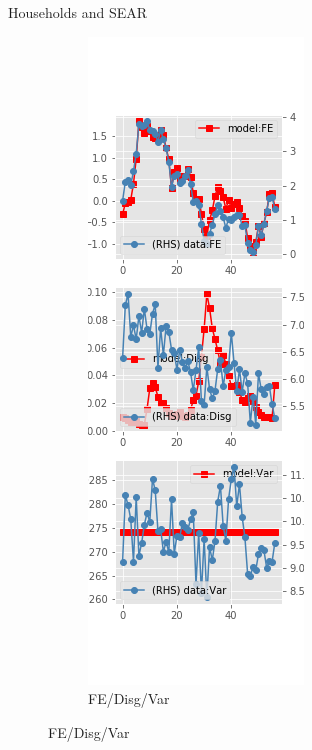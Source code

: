 \documentclass{beamer}
\begin{document}
\begin{frame}{Households and SEAR}
\begin{figure}[ht]
\begin{subfigure}[b]{0.2\textwidth}
		\end{subfigure}
		\hfill
		\begin{subfigure}[b]{0.2\textwidth}
			\caption{FE/Disg/Var}
			\includegraphics[width=\textwidth, height = 0.8\textheight]{figuresDraft/sce_se_est_diag3.png}
		\end{subfigure}
		\hfill
	\end{figure}
\end{frame}
\end{document}
